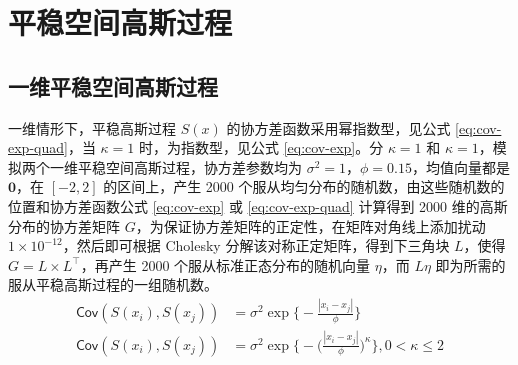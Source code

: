 \documentclass[12pt,a4paper,UTF8,twoside]{book}
\theoremstyle{definition}
\theoremstyle{definition}
\theoremstyle{definition}
\theoremstyle{remark}
\begin{document}
\hypertarget{spatial-gaussian-processes}{%
\section{平稳空间高斯过程}\label{spatial-gaussian-processes}}

\hypertarget{sim-one-gp}{%
\subsection{一维平稳空间高斯过程}\label{sim-one-gp}}

一维情形下，平稳高斯过程 \(S(x)\) 的协方差函数采用幂指数型，见公式
\eqref{eq:cov-exp-quad}，当 \(\kappa =1\) 时，为指数型，见公式
\eqref{eq:cov-exp}。分 \(\kappa =1\) 和
\(\kappa =1\)，模拟两个一维平稳空间高斯过程，协方差参数均为
\(\sigma^2 = 1\)，\(\phi = 0.15\)，均值向量都是 \(\mathbf{0}\)，在
\([-2,2]\) 的区间上，产生 2000
个服从均匀分布的随机数，由这些随机数的位置和协方差函数公式
\eqref{eq:cov-exp} 或 \eqref{eq:cov-exp-quad} 计算得到 2000
维的高斯分布的协方差矩阵
\(G\)，为保证协方差矩阵的正定性，在矩阵对角线上添加扰动
\(1 \times 10^{-12}\)，然后即可根据 Cholesky
分解该对称正定矩阵，得到下三角块 \(L\)，使得
\(G = L \times L^{\top}\)，再产生 2000 个服从标准正态分布的随机向量
\(\eta\)，而 \(L\eta\) 即为所需的服从平稳高斯过程的一组随机数。
\begin{align}
\mathsf{Cov}(S(x_i), S(x_j)) & = \sigma^2 \exp\big\{ - \frac{|x_{i} - x_{j}|}{ \phi } \big\}  \label{eq:cov-exp} \\
\mathsf{Cov}(S(x_i), S(x_j)) & = \sigma^2 \exp\big\{ -\big( \frac{ |x_{i} - x_{j}| }{ \phi } \big) ^ {\kappa} \big\}, 0 < \kappa \leq 2  \label{eq:cov-exp-quad} 
\end{align}
\end{document}
